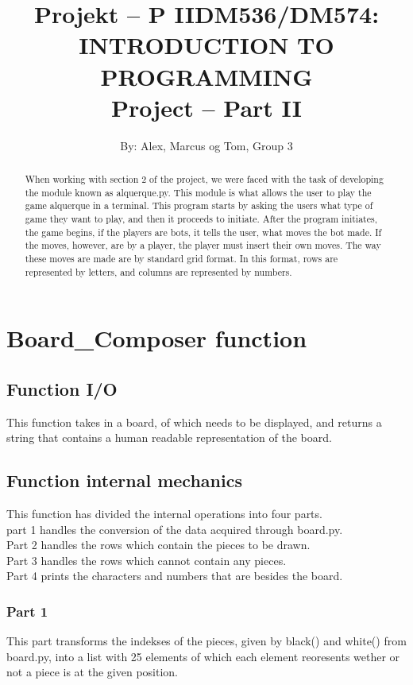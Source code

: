 \documentclass[12pt]{article}
\title{Projekt – P II}
\title{DM536/DM574: INTRODUCTION TO PROGRAMMING \\ Project – Part II}
\author{By: Alex, Marcus og Tom, Group 3}
\begin{document}
\maketitle

\begin{abstract}
When working with section 2 of the project, we were faced with the task of developing the module known as alquerque.py. This module is what allows the user to play the game alquerque in a terminal. This program starts by asking the users what type of game they want to play, and then it proceeds to initiate. After the program initiates, the game begins, if the players are bots, it tells the user, what moves the bot made. If the moves, however, are by a player, the player must insert their own moves. The way these moves are made are by standard grid format. In this format, rows are represented by letters, and columns are represented by numbers.
\end{abstract}

\section{}

\section{Board_Composer function}
\subsection{Function I/O}
This function takes in a board, of which needs to be displayed, and returns a string that contains a human readable representation of the board.
\subsection{Function internal mechanics}
This function has divided the internal operations into four parts.\\
part 1 handles the conversion of the data acquired through board.py.\\
Part 2 handles the rows which contain the pieces to be drawn.\\
Part 3 handles the rows which cannot contain any pieces.\\
Part 4 prints the characters and numbers that are besides the board.\\

\subsubsection{Part 1}
This part transforms the indekses of the pieces, given by black() and white() from board.py, into a list with 25 elements of which each element reoresents wether or not a piece is at the given position.
\end{document}
